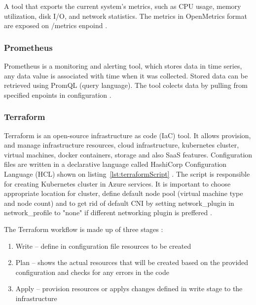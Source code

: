 A tool that exports the current system's metrics, such as CPU usage, memory utilization, disk I/O, and network statistics. The metrics in OpenMetrics format are exposed on /metrics enpoind \cite{NodeExporter}.

\subsubsection{Prometheus}
\label{sec:prometheus}

Prometheus is a monitoring and alerting tool, which stores data in time series, any data value is associated with time when it was collected. Stored data can be retrieved using PromQL (query language). The tool colects data by pulling from specified enpoints in configuration \cite{Prometheus}. 

\subsubsection{Terraform}
\label{sec:terraform}

Terraform is an open-source infrastructure as code (IaC) tool. It allows provision, and manage infrastructure resources, cloud infrastructure, kubernetes cluster, virtual machines, docker containers, storage and also SaaS features. Configuration files are written in a declarative language called HashiCorp Configuration Language (HCL) shown on listing~\ref{lst:terraformScript} \cite{Terraform}. The script is responsible for creating Kubernetes cluster in Azure services. It is important to choose appropriate location for cluster, define default node pool (virtual machine type and node count) and to get rid of default CNI by setting network\_plugin in network\_profile to "none" if different networking plugin is preffered \cite{AKS}.

The Terraform workflow is made up of three stages \cite{Terraform}:
\begin{enumerate}
  \item Write -- define in configuration file resources to be created
  \item Plan -- shows the actual resources that will be created based on the provided configuration and checks for any errors in the code
  \item Apply -- provision resources or applys changes defined in write stage to the infrastructure 
\end{enumerate}

